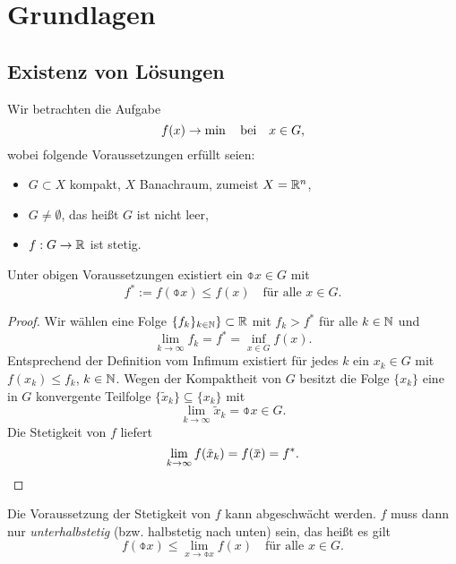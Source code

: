 \chapter{Grundlagen}
\section{Existenz von Lösungen}
Wir betrachten die Aufgabe
\begin{equation}
  f(x) \to \min \quad \text{bei} \quad x \in G,
\end{equation}
wobei folgende Voraussetzungen erfüllt seien:
\begin{itemize}
\item $G \subset X$ kompakt, $X$ Banachraum, zumeist $X = \mathbb{R}^n$,
\item $G \ne \emptyset$, das heißt $G$ ist nicht leer,
\item $f: G \to \mathbb{R}$ ist stetig.
\end{itemize}

\begin{thm}
  Unter obigen Voraussetzungen existiert ein $\obar{x} \in G$ mit
  \[ f^* := f( \obar{x} ) \le f(x) \quad \text{für alle } x \in G. \]
\end{thm}

\begin{proof}
  Wir wählen eine Folge $\{f_k\}_{k \in \mathbb{N}}\} \subset \mathbb{R}$ mit $f_k > f^*$
  für alle $k \in \mathbb{N}$ und
  \[ \lim_{k \to \infty} f_k = f^* = \inf_{x \in G} f(x). \]
  Entsprechend der Definition vom Infimum existiert für jedes $k$ ein
  $x_k \in G$ mit $f(x_k) \le f_k$, $k \in \mathbb{N}$. Wegen der Kompaktheit von $G$
  besitzt die Folge $\{x_k\}$ eine in $G$ konvergente Teilfolge $\{ \tilde{x}_k \}
  \subseteq \{ x_k \}$ mit
  \[ \lim_{k \to \infty} \tilde{x}_k = \obar{x} \in G. \]
  Die Stetigkeit von $f$ liefert
  \[ \lim_{k \to \infty} f(\tilde{x}_k) = f(\obar{x}) = f^*. \qedhere \]
\end{proof}

\begin{rmrk}
  Die Voraussetzung der Stetigkeit von $f$ kann abgeschwächt werden. $f$ muss
  dann nur \emph{unterhalbstetig} (bzw. halbstetig nach unten) sein, das heißt
  es gilt
  \[ f( \obar{x} ) \le \lim_{x \to \obar{x}} f(x) \quad \text{für alle } x \in
    G. \]
\end{rmrk}

